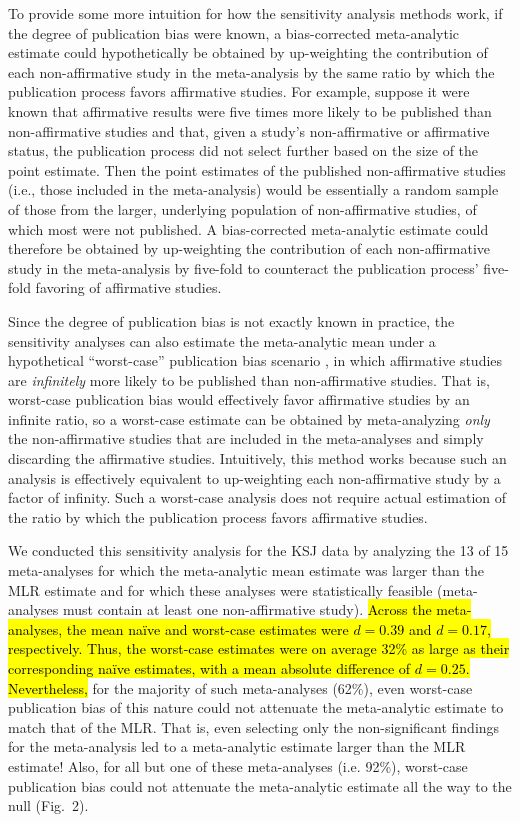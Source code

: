 \documentclass[man,floatsintext]{apa7}
\begin{document}
To provide some more intuition for how the sensitivity analysis methods work, if the degree of publication bias were known, a bias-corrected meta-analytic estimate could hypothetically be obtained by up-weighting the contribution of each non-affirmative study in the meta-analysis by the same ratio by which the publication process favors affirmative studies. For example, suppose it were known that affirmative results were five times more likely to be published than non-affirmative studies and that, given a study’s non-affirmative or affirmative status, the publication process did not select further based on the size of the point estimate. Then the point estimates of the published non-affirmative studies (i.e., those included in the meta-analysis) would be essentially a random sample of those from the larger, underlying population of non-affirmative studies, of which most were not published. A bias-corrected meta-analytic estimate could therefore be obtained by up-weighting the contribution of each non-affirmative study in the meta-analysis by five-fold to counteract the publication process’ five-fold favoring of affirmative studies.

Since the degree of publication bias is not exactly known in practice, the sensitivity analyses can also estimate the meta-analytic mean under a hypothetical “worst-case” publication bias scenario \parencite{mathur2019sensitivity}, in which affirmative studies are \emph{infinitely} more likely to be published than non-affirmative studies.  That is, worst-case publication bias would effectively favor affirmative studies by an infinite ratio, so a worst-case estimate can be obtained by meta-analyzing \emph{only} the non-affirmative studies that are included in the meta-analyses and simply discarding the affirmative studies. Intuitively, this method works because such an analysis is effectively equivalent to up-weighting each non-affirmative study by a factor of infinity. Such a worst-case analysis does not require actual estimation of the ratio by which the publication process favors affirmative studies.
 

We conducted this sensitivity analysis for the KSJ data by analyzing the 13 of 15 meta-analyses for which the meta-analytic mean estimate was larger than the MLR estimate and for which these analyses were statistically feasible (meta-analyses must contain at least one non-affirmative study). \hl{Across the meta-analyses, the mean na{\"i}ve and worst-case estimates were $d=0.39$ and $d=0.17$, respectively. Thus, the worst-case estimates were on average 32\% as large as their corresponding na{\"i}ve estimates, with a mean absolute difference of $d=0.25$. Nevertheless, }for the majority of such meta-analyses (62\%), even worst-case publication bias of this nature could not attenuate the meta-analytic estimate to match that of the MLR. That is, even selecting only the non-significant findings for the meta-analysis led to a meta-analytic estimate larger than the MLR estimate! Also, for all but one of these meta-analyses (i.e. 92\%), worst-case publication bias could not attenuate the meta-analytic estimate all the way to the null (Fig.\ 2).
\end{document}
